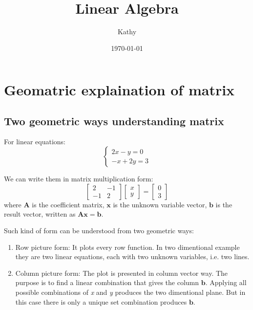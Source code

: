 \documentclass[a4paper,12pt]{article}
\title{Linear Algebra}
\author{Kathy}
\date{\today}
\begin{document}
\maketitle

\section{Geomatric explaination of matrix}

\subsection{Two geometric ways understanding matrix}

For linear equations:
\begin{equation}
  \label{eq:3}
  \begin{cases}
    2x - y = 0 \\
    -x + 2y = 3
  \end{cases}
\end{equation}

We can write them in matrix multiplication form:
\begin{equation}
  \label{eq:2}
  \begin{bmatrix}
    2 & -1\\
    -1 & 2
  \end{bmatrix}
  \begin{bmatrix}
    x \\ y
  \end{bmatrix}
  = \begin{bmatrix}
    0 \\ 3
  \end{bmatrix}
\end{equation}
where  $\boldsymbol{A}$ is the coefficient matrix, $\boldsymbol{x}$ is the
unknown variable vector, $\boldsymbol{b}$ is the result vector, written as $\boldsymbol{Ax = b}$.

Such kind of form can be understood from two geometric ways:

\begin{enumerate}[(1)]
  \item Row picture form:
    It plots every row function. In two dimentional example they are two linear
equations, each with two unknown variables, i.e. two lines.

  \item Column picture form:
    The plot is presented in column vector way. The purpose is to find a linear
combination that gives the column $\boldsymbol{b}$. Applying all possible
combinations of \textit{x} and \textit{y} produces the two dimentional plane.
But in this case there is only a unique set combination produces $\boldsymbol{b}$.
\end{enumerate}
\end{document}
